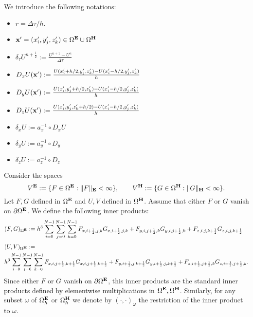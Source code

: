 \documentclass[12pt,reqno]{amsart}
\newcommand{\e}{{\bf E}}
\newcommand{\h}{{\bf H}}
\theoremstyle{definition}
\numberwithin{equation}{section}
\def\Gw{\Omega}     \def\Gx{\Xi}         \def\Gy{\Psi}
\def\Gwh{\Omega_h}
\begin{document}
   
   We introduce the following notations:
	\begin{itemize}
		\item $r=\Delta \tau/h$.\\[1mm]
		\item ${\bf x'}=(x_i',y_j',z_k')\in \Gw^\e\cup\Gw^\h$\\[1mm]
		\item $\delta_{\tau} U^{n+\frac{1}{2}}:=\frac{U^{n+1}-U^{n}}{\Delta \tau}$\\[1mm]
				\item $D_x U({\bf x'}):=\frac{U(x_i'+h/2,y_j',z_k')-U(x_i'-h/2,y_j',z_k')}{h}$\\[1mm]
	\item $D_y U({\bf x'}):=\frac{U(x_i',y_j'+h/2,z_k')-U(x_i'-h/2,y_j',z_k')}{h}$\\[1mm]
		\item $D_z U({\bf x'}):=\frac{U(x_i',y_j',z_k'+h/2)-U(x_i'-h/2,y_j',z_k')}{h}$\\[1mm]
		\item $\delta_x U:=a_x^{-1}\circ D_xU$\\[1mm]
		\item $\delta_y U:=a_y^{-1}\circ D_y$\\[1mm]
		\item 	$\delta_z U:=a_z^{-1}\circ D_z$\\[1mm]
	\end{itemize}
		Consider  the spaces 
		$$
		V^{\bf{E}}:=\{F \in \Gw^{\bf{E}}:\|F\|_{\bf{E}}<\infty\}, \qquad 
		V^{\bf{H}}:=\{G \in \Gw^{\bf{H}}:\|G\|_{\bf{H}}<\infty\}.
		$$
		Let $F,G$ defined in $\Gw^{\bf{E}}$ and $U,V$ defined in 
		$\Gw^{\bf{H}}$. Assume that either $F$ or $G$ vanish on $\partial \Gw^\e$.
		We define the following inner products:
		\begin{align*}
&
		(F,G)_{\Gw^\e}:=
		h^3\sum_{i=0}^{N-1}\sum_{j=0}^{N-1}\sum_{k=0}^{N-1}
		F_{x,i+\frac{1}{2},j,k}G_{x,i+\frac{1}{2},j,k}+
		F_{y,i,j+\frac{1}{2},k}G_{y,i,j+\frac{1}{2},k}+F_{z,i,j,k+\frac{1}{2}}G_{z,i,j,k+\frac{1}{2}}
	\end{align*}
		\begin{align*}
			&
			(U,V)_{\Gw^\h}:=\\&
			h^3\sum_{i=0}^{N-1}\sum_{j=0}^{N-1}\sum_{k=0}^{N-1}
			F_{x,i,j+\frac{1}{2},k+\frac{1}{2}}G_{x,i,j+\frac{1}{2},k+\frac{1}{2}}+
			F_{y,i+\frac{1}{2},j,k+\frac{1}{2}}G_{y,i+\frac{1}{2},j,k+\frac{1}{2}}+F_{z,i+\frac{1}{2},j+\frac{1}{2},k}G_{z,i+\frac{1}{2},j+\frac{1}{2},k}.
		\end{align*}
		Since either $F$ or $G$ vanish on $\partial \Gw^\e$, this inner products are the standard inner products defined by elementwise  multiplications in $\Gw^\e, \Gw^\h$.
		Similarly, for any subset $\omega$ of $\Gwh^\e$ or $\Gwh^\h$ we denote by $(\cdot,\cdot)_{\omega}$ the restriction of the  inner product to $\omega$.
		
\end{document}
